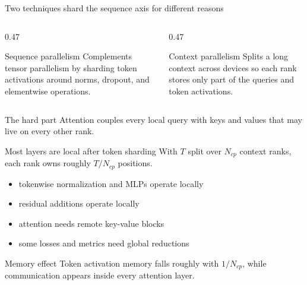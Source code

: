 \documentclass[handout]{beamer}
\begin{document}
\begin{frame}{Two techniques shard the sequence axis for different reasons}
  \begin{columns}[t]
    \begin{column}{0.47\linewidth}
      \begin{block}{Sequence parallelism}
        Complements tensor parallelism by sharding token activations around norms, dropout, and elementwise operations.
      \end{block}
    \end{column}
    \begin{column}{0.47\linewidth}
      \begin{block}{Context parallelism}
        Splits a long context across devices so each rank stores only part of the queries and token activations.
      \end{block}
    \end{column}
  \end{columns}
  \begin{alertblock}{The hard part}
    Attention couples every local query with keys and values that may live on every other rank.
  \end{alertblock}
\end{frame}

\begin{frame}{Most layers are local after token sharding}
  With $T$ split over $N_{cp}$ context ranks, each rank owns roughly $T/N_{cp}$ positions.
  \begin{itemize}
      \setlength{\itemsep}{7pt}
    \item tokenwise normalization and MLPs operate locally
    \item residual additions operate locally
    \item attention needs remote key-value blocks
    \item some losses and metrics need global reductions
  \end{itemize}
  \begin{block}{Memory effect}
    Token activation memory falls roughly with $1/N_{cp}$, while communication appears inside every attention layer.
  \end{block}
\end{frame}
\end{document}
